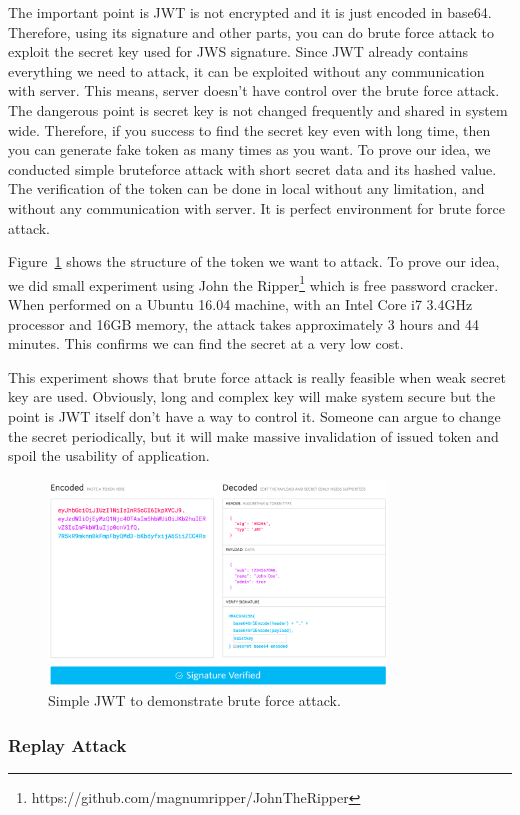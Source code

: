 \documentclass[journal,article,submit,moreauthors,pdftex,10pt,a4paper]{mdpi}
\begin{document}
The important point is JWT is not encrypted and it is just encoded in base64. Therefore, using its signature and other parts, you can do brute force attack to exploit the secret key used for JWS signature. Since JWT already contains everything we need to attack, it can be exploited without any communication with server. This means, server doesn't have control over the brute force attack. The dangerous point is secret key is not changed frequently and shared in system wide. Therefore, if you success to find the secret key even with long time, then you can generate fake token as many times as you want. To prove our idea, we conducted simple bruteforce attack with short secret data and its hashed value. The verification of the token can be done in local without any limitation, and without any communication with server. It is perfect environment for brute force attack.

Figure~\ref{bruteforce} shows the structure of the token we want to attack. To prove our idea, we did small experiment using John the Ripper\footnote{https://github.com/magnumripper/JohnTheRipper} which is free password cracker. When performed on a Ubuntu 16.04 machine, with an Intel Core i7 3.4GHz processor and 16GB memory, the attack takes approximately 3 hours and 44 minutes. This confirms we can find the secret at a very low cost.

This experiment shows that brute force attack is really feasible when weak secret key are used. Obviously, long and complex key will make system secure but the point is JWT itself don't have a way to control it. Someone can argue to change the secret periodically, but it will make massive invalidation of issued token and spoil the usability of application.
\begin{figure}[H]
\centering
\includegraphics[width=9cm]{figures/bruteforce}
\caption{Simple JWT to demonstrate brute force attack.}
\label{bruteforce}
\end{figure}

\subsubsection{Replay Attack}
\end{document}
